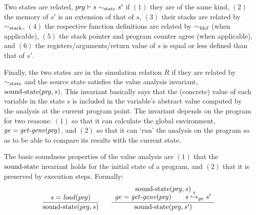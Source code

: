 

Two states are related, ${pr\hspace*{-1pt}g} \vdash s \sim_{\mathrm{state}} s'$
if $(1)$ they are of the same kind, 
$(2)$ the memory of $s'$ is an extension of that of $s$, 
$(3)$ their stacks are related by $\sim_{\mathrm{stack}}$,
$(4)$ the respective function definitions are related by $\sim_{\mathrm{fdef}}$ (when applicable),
$(5)$ the stack pointer and program counter agree (when applicable), and
$(6)$ the registers/arguments/return value of $s$ is equal or less defined than that of $s'$. 

Finally, the two states are in the simulation relation $R$
if they are related by $\sim_{\mathrm{state}}$ and 
the source state satisfies the value analysis invariant, $\mathrm{sound\text{-}state}({pr\hspace*{-1pt}g},s)$.
This invariant basically says that the (concrete) value of each variable in the state $s$ is included in the variable's abstract value computed by the analysis at the current program point.
The invariant depends on the program for two reasons:
$(1)$ so that it can calculate the global environment, $ge=\mathit{get\text{-}genv}({pr\hspace*{-1pt}g})$, and
$(2)$ so that it can `run' the analysis on the program so as to be able to compare its results with the current state.


The basic soundness properties of the value analysis are
$(1)$ that the $\mathrm{sound\text{-}state}$ invariant holds for the initial state of a program, and
$(2)$ that it is preserved by execution steps.
Formally:
\[
\frac{s = \mathit{load}({pr\hspace*{-1pt}g})}{
  \mathrm{sound\text{-}state}({pr\hspace*{-1pt}g},s)
}
\quad~~
\frac{ 
\begin{array}{c}
  \mathrm{sound\text{-}state}({pr\hspace*{-1pt}g},s) \\[-4pt]
  ge = \mathit{get\text{-}genv}({pr\hspace*{-1pt}g})  \qquad
  s \stackrel{t}{\hookrightarrow}_{ge} s' 
\end{array}
}{
  \mathrm{sound\text{-}state}({pr\hspace*{-1pt}g},s')
}
\]

